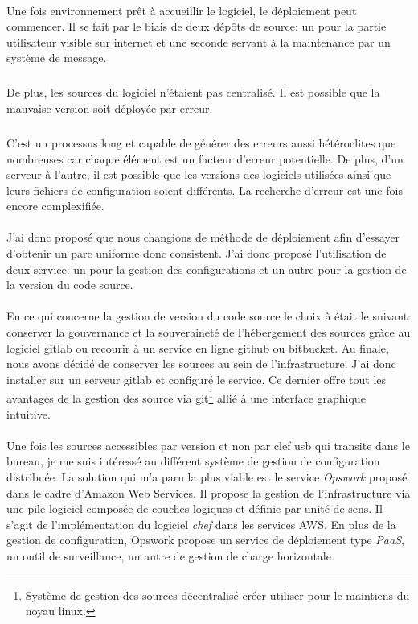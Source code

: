 \documentclass[11pt, a4paper ]{article}
\begin{document}
\begin{spacing}{1.5}
\paragraph{}
Une fois environnement prêt à accueillir le logiciel, le déploiement peut commencer. Il se fait par le biais de deux dépôts de source: un pour la partie utilisateur visible sur internet et une seconde servant à la maintenance par un système de message.
\subparagraph{}
De plus, les sources du logiciel n'étaient pas centralisé. Il est possible que la mauvaise version soit déployée par erreur.
\subparagraph{}
C'est un processus long et capable de générer des erreurs aussi hétéroclites que nombreuses car chaque élément est un facteur d'erreur potentielle. De plus, d'un serveur à l'autre, il est possible que les versions des logiciels utilisées ainsi que leurs fichiers de configuration soient différents. La recherche d'erreur est une fois encore complexifiée.
\paragraph{}
J'ai donc proposé que nous changions de méthode de déploiement afin d'essayer d'obtenir un parc uniforme donc consistent. J'ai donc proposé l'utilisation de deux service: un pour la gestion des configurations et un autre pour la gestion de la version du code source.
\paragraph{}
En ce qui concerne la gestion de version du code source le choix à était le suivant: conserver la gouvernance et la souveraineté de l'hébergement des sources gràce au logiciel gitlab ou recourir à un service en ligne github ou bitbucket. Au finale, nous avons décidé de conserver les sources au sein de l'infrastructure. J'ai donc installer sur un serveur gitlab et configuré le service. Ce dernier offre tout les avantages de la gestion des source via git\footnote{Système de gestion des sources décentralisé créer utiliser pour le maintiens du noyau linux.} allié à une interface graphique intuitive.
\paragraph{}
Une fois les sources accessibles par version et non par clef usb qui transite dans le bureau, je me suis intéressé au différent système de gestion de configuration distribuée. La solution qui m'a paru la plus viable est le service \emph{Opswork} proposé dans le cadre d'Amazon Web Services. Il propose la gestion de l'infrastructure via une pile logiciel composée de couches logiques et définie par unité de sens. Il s'agit de l'implémentation du logiciel \emph{chef} dans les services AWS. En plus de la gestion de configuration, Opswork propose un service de déploiement type \emph{PaaS}, un outil de surveillance, un autre de gestion de charge horizontale.

\end{spacing}
\end{document}
